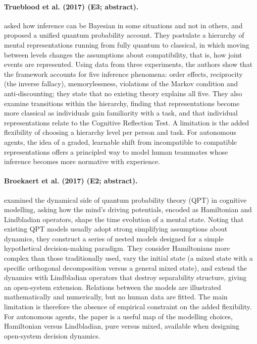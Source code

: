 \documentclass[10pt,a4paper]{article}
\begin{document}
\paragraph{Trueblood et al. (2017) (E3; abstract).} \citet{Trueblood2017a} asked how inference can be Bayesian in some situations and not in others, and proposed a unified quantum probability account. They postulate a hierarchy of mental representations running from fully quantum to classical, in which moving between levels changes the assumptions about compatibility, that is, how joint events are represented. Using data from three experiments, the authors show that the framework accounts for five inference phenomena: order effects, reciprocity (the inverse fallacy), memorylessness, violations of the Markov condition and anti-discounting; they state that no existing theory explains all five. They also examine transitions within the hierarchy, finding that representations become more classical as individuals gain familiarity with a task, and that individual representations relate to the Cognitive Reflection Test. A limitation is the added flexibility of choosing a hierarchy level per person and task. For autonomous agents, the idea of a graded, learnable shift from incompatible to compatible representations offers a principled way to model human teammates whose inference becomes more normative with experience.

\paragraph{Broekaert et al. (2017) (E2; abstract).} \citet{Broekaert2017} examined the dynamical side of quantum probability theory (QPT) in cognitive modelling, asking how the mind's driving potentials, encoded as Hamiltonian and Lindbladian operators, shape the time evolution of a mental state. Noting that existing QPT models usually adopt strong simplifying assumptions about dynamics, they construct a series of nested models designed for a simple hypothetical decision-making paradigm. They consider Hamiltonians more complex than those traditionally used, vary the initial state (a mixed state with a specific orthogonal decomposition versus a general mixed state), and extend the dynamics with Lindbladian operators that destroy separability structure, giving an open-system extension. Relations between the models are illustrated mathematically and numerically, but no human data are fitted. The main limitation is therefore the absence of empirical constraint on the added flexibility. For autonomous agents, the paper is a useful map of the modelling choices, Hamiltonian versus Lindbladian, pure versus mixed, available when designing open-system decision dynamics.
\end{document}
